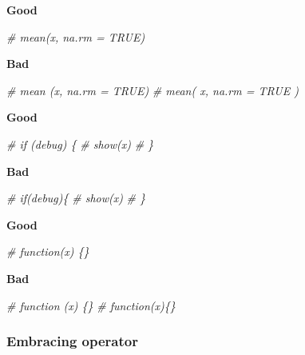 \documentclass[
]{article}
\newenvironment{Shaded}{\begin{snugshade}}{\end{snugshade}}
\newcommand{\CommentTok}[1]{\textcolor[rgb]{0.56,0.35,0.01}{\textit{#1}}}
\begin{document}
\textbf{Good}

\begin{Shaded}
\begin{Highlighting}[]
\CommentTok{# mean(x, na.rm = TRUE)}
\end{Highlighting}
\end{Shaded}

\textbf{Bad}

\begin{Shaded}
\begin{Highlighting}[]
\CommentTok{# mean (x, na.rm = TRUE)}
\CommentTok{# mean( x, na.rm = TRUE )}
\end{Highlighting}
\end{Shaded}

\textbf{Good}

\begin{Shaded}
\begin{Highlighting}[]
\CommentTok{# if (debug) \{}
\CommentTok{#   show(x)}
\CommentTok{# \}}
\end{Highlighting}
\end{Shaded}

\textbf{Bad}

\begin{Shaded}
\begin{Highlighting}[]
\CommentTok{# if(debug)\{}
\CommentTok{#   show(x)}
\CommentTok{# \}}
\end{Highlighting}
\end{Shaded}

\textbf{Good}

\begin{Shaded}
\begin{Highlighting}[]
\CommentTok{# function(x) \{\}}
\end{Highlighting}
\end{Shaded}

\textbf{Bad}

\begin{Shaded}
\begin{Highlighting}[]
\CommentTok{# function (x) \{\}}
\CommentTok{# function(x)\{\}}
\end{Highlighting}
\end{Shaded}

\hypertarget{embracing-operator}{%
\subsubsection{Embracing operator}\label{embracing-operator}}
\end{document}
